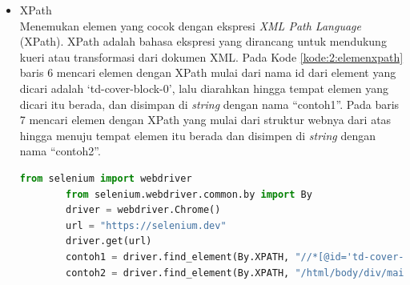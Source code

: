 \begin{itemize}
	\item XPath\\
	Menemukan elemen yang cocok dengan ekspresi \textit{XML Path Language} (XPath). XPath adalah bahasa ekspresi yang dirancang untuk mendukung kueri atau transformasi dari dokumen XML\cite{xpath}. Pada Kode \ref{kode:2:elemenxpath} baris 6 mencari elemen dengan XPath mulai dari nama id dari element yang dicari adalah `td-cover-block-0', lalu diarahkan hingga tempat elemen yang dicari itu berada, dan disimpan di \textit{string} dengan nama ``contoh1''. Pada baris 7 mencari elemen dengan XPath yang mulai dari struktur webnya dari atas hingga menuju tempat elemen itu berada dan disimpen di \textit{string} dengan nama ``contoh2''.
	\begin{lstlisting}[language=python, caption=Contoh kode untuk menemukan elemen dengan ekspresi XPath, label=kode:2:elemenxpath]
		from selenium import webdriver
		from selenium.webdriver.common.by import By
		driver = webdriver.Chrome()
		url = "https://selenium.dev"
		driver.get(url)
		contoh1 = driver.find_element(By.XPATH, "//*[@id='td-cover-block-0']/div/div/div/div/h1")
		contoh2 = driver.find_element(By.XPATH, "/html/body/div/main/section[1]/div/div/div/div/h1")
	\end{lstlisting}
\end{itemize}

